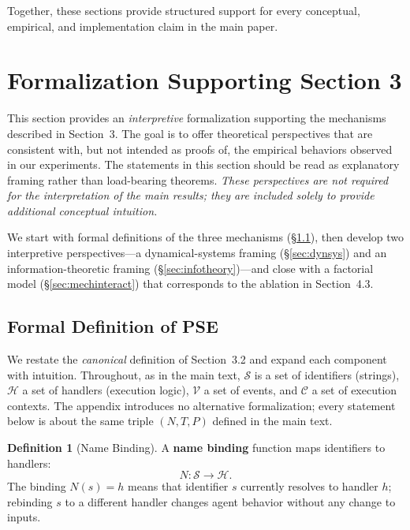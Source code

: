 \documentclass{article}
\theoremstyle{plain}
\theoremstyle{definition}
\newtheorem{definition}[theorem]{Definition}
\begin{document}
\noindent Together, these sections provide structured support for every conceptual, empirical, and implementation claim in the main paper.


\section{Formalization Supporting Section 3}
\label{sec:formal}

This section provides an \emph{interpretive} formalization supporting the mechanisms described in Section~3. The goal is to offer theoretical perspectives that are consistent with, but not intended as proofs of, the empirical behaviors observed in our experiments. The statements in this section should be read as explanatory framing rather than load-bearing theorems. \emph{These perspectives are not required for the interpretation of the main results; they are included solely to provide additional conceptual intuition.}


We start with formal definitions of the three mechanisms (\S\ref{sec:formaldef}), then develop two interpretive perspectives---a dynamical-systems framing (\S\ref{sec:dynsys}) and an information-theoretic framing (\S\ref{sec:infotheory})---and close with a factorial model (\S\ref{sec:mechinteract}) that corresponds to the ablation in Section~4.3.

\subsection{Formal Definition of PSE}
\label{sec:formaldef}

We restate the \emph{canonical} definition of Section~3.2 and expand each component with intuition. Throughout, as in the main text, $\mathcal{S}$ is a set of identifiers (strings), $\mathcal{H}$ a set of handlers (execution logic), $\mathcal{V}$ a set of events, and $\mathcal{C}$ a set of execution contexts. The appendix introduces no alternative formalization; every statement below is about the same triple $(N, T, P)$ defined in the main text.

\begin{definition}[Name Binding]
A \textbf{name binding} function maps identifiers to handlers:
\begin{equation}
N: \mathcal{S} \rightarrow \mathcal{H}.
\end{equation}
The binding $N(s) = h$ means that identifier $s$ currently resolves to handler $h$; rebinding $s$ to a different handler changes agent behavior without any change to inputs.
\end{definition}
\end{document}

